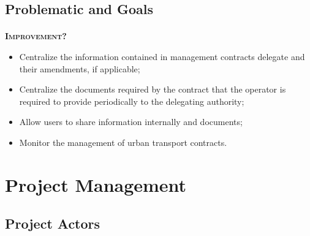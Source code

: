\subsection{Problematic and Goals}
\begin{frame}{\insertsectionhead}
  \framesubtitle{\insertsubsectionhead}
  \textbf{\textsc{Improvement?}}
\begin{itemize}
  \item Centralize the information contained in management contracts
  delegate and their amendments, if applicable;
  \item Centralize the documents required by the contract that the operator is
  required to provide periodically to the delegating authority;
  \item Allow users to share information internally
  and documents;
  \item Monitor the management of urban transport contracts.
\end{itemize}
\end{frame}
\section{Project Management}

\subsection{Project Actors}

